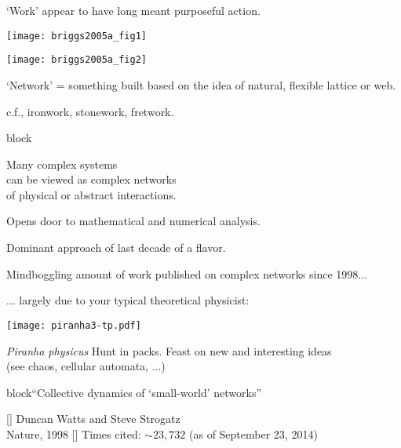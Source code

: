       \alert{`Work'} appear to have long meant purposeful action.
    
  

      
    \texttt{[image: briggs2005a\_fig1]}
    
    \texttt{[image: briggs2005a\_fig2]}
  
  
    
    
      `Network' = something built
      based on the idea of natural, flexible lattice or web.
     
      c.f., ironwork, stonework, fretwork.
    
  

{block}{}
  
   
    Many \alert{complex systems}\\ 
    can be viewed as \alert{complex networks}\\
    of physical or abstract interactions.
   
    Opens door to mathematical and numerical analysis.
    
    Dominant approach of last decade of 
    a  flavor.
    
    Mindboggling amount of work published 
    on complex networks since 1998...
    
    ... largely due to your typical theoretical physicist:
          
      
      \smallskip
              
        \texttt{[image: piranha3-tp.pdf]}
        
        
         \textit{Piranha physicus}
         Hunt in packs.
         Feast on new and interesting ideas \\
          {\small (see chaos, cellular automata, ...)}
        
            
    
  
{block}{``Collective dynamics of `small-world' networks''\cite{watts1998a}}
    
    [] 
      Duncan Watts and Steve Strogatz\\
      Nature, 1998
    [] 
      {Times cited: {\alert{$\sim 23,732$}} }
      {\tiny(as of September 23, 2014)}
      
